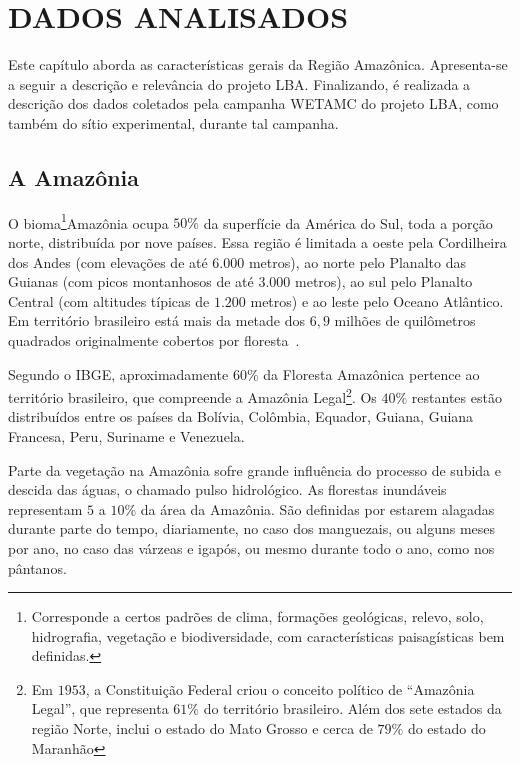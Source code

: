 
\chapter{DADOS ANALISADOS}

Este capítulo aborda as características gerais da Região Amazônica. Apresenta-se a seguir a descrição e relevância do projeto LBA. Finalizando, é realizada a descrição dos dados coletados pela campanha WETAMC do projeto LBA, como também do sítio experimental, durante tal campanha.

\section{A Amazônia}
\label{sec:amazonia}

O bioma\footnote{Corresponde a certos padrões de clima, formações geológicas, relevo, solo, hidrografia, vegetação e biodiversidade, com características paisagísticas bem definidas.}Amazônia ocupa $50\%$ da superfície da América do Sul, toda a porção norte, distribuída por nove países. Essa região é limitada a oeste pela Cordilheira dos Andes (com elevações de até $6.000$ metros), ao norte pelo Planalto das Guianas (com picos montanhosos de até $3.000$ metros), ao sul pelo Planalto Central (com altitudes típicas de $1.200$ metros) e ao leste pelo Oceano Atlântico. Em território brasileiro está mais da metade dos $6,9$ milhões de quilômetros quadrados originalmente cobertos por floresta~\cite{fisch/98}. 

Segundo o IBGE, aproximadamente $60\%$ da Floresta Amazônica pertence ao território brasileiro, que compreende a Amazônia Legal\footnote{Em $1953$, a Constituição Federal criou o conceito político de ``Amazônia Legal'', que representa $61\%$ do território brasileiro. Além dos sete estados da região Norte, inclui o estado do Mato Grosso e cerca de $79\%$ do estado do Maranhão}. Os $40\%$ restantes estão distribuídos entre os países da Bolívia, Colômbia, Equador, Guiana, Guiana Francesa, Peru, Suriname e Venezuela. 

Parte da vegetação na Amazônia sofre grande influência do processo de subida e descida das águas, o chamado pulso hidrológico. As florestas inundáveis representam $5$ a $10\%$ da área da Amazônia. São definidas por estarem alagadas durante parte do tempo, diariamente, no caso dos manguezais, ou alguns meses por ano, no caso das várzeas e igapós, ou mesmo durante todo o ano, como nos pântanos. 


